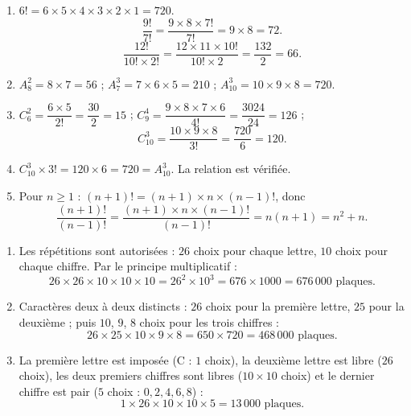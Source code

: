\documentclass[11pt]{article}
\begin{document}
\begin{corrige}
\begin{enumerate}
\item $6! = 6 \times 5 \times 4 \times 3 \times 2 \times 1 = 720$.
\[ \frac{9!}{7!} = \frac{9 \times 8 \times 7!}{7!} = 9 \times 8 = 72. \]
\[ \frac{12!}{10! \times 2!} = \frac{12 \times 11 \times 10!}{10! \times 2} = \frac{132}{2} = 66. \]
\item $A_8^2 = 8 \times 7 = 56$ ; \quad $A_7^3 = 7 \times 6 \times 5 = 210$ ; \quad $A_{10}^3 = 10 \times 9 \times 8 = 720$.
\item $C_6^2 = \dfrac{6 \times 5}{2!} = \dfrac{30}{2} = 15$ ; \quad $C_9^4 = \dfrac{9 \times 8 \times 7 \times 6}{4!} = \dfrac{3024}{24} = 126$ ;
\[ C_{10}^3 = \frac{10 \times 9 \times 8}{3!} = \frac{720}{6} = 120. \]
\item $C_{10}^3 \times 3! = 120 \times 6 = 720 = A_{10}^3$. La relation est vérifiée.
\item Pour $n \ge 1$ : $(n+1)! = (n+1) \times n \times (n-1)!$, donc
\[ \frac{(n+1)!}{(n-1)!} = \frac{(n+1) \times n \times (n-1)!}{(n-1)!} = n(n+1) = n^2 + n. \]
\end{enumerate}
\end{corrige}

\begin{corrige}
\begin{enumerate}
\item Les répétitions sont autorisées : $26$ choix pour chaque lettre, $10$ choix pour chaque chiffre. Par le principe multiplicatif :
\[ 26 \times 26 \times 10 \times 10 \times 10 = 26^2 \times 10^3 = 676 \times 1000 = 676\,000 \text{ plaques}. \]
\item Caractères deux à deux distincts : $26$ choix pour la première lettre, $25$ pour la deuxième ; puis $10$, $9$, $8$ choix pour les trois chiffres :
\[ 26 \times 25 \times 10 \times 9 \times 8 = 650 \times 720 = 468\,000 \text{ plaques}. \]
\item La première lettre est imposée (C : $1$ choix), la deuxième lettre est libre ($26$ choix), les deux premiers chiffres sont libres ($10 \times 10$ choix) et le dernier chiffre est pair ($5$ choix : $0, 2, 4, 6, 8$) :
\[ 1 \times 26 \times 10 \times 10 \times 5 = 13\,000 \text{ plaques}. \]
\end{enumerate}
\end{corrige}
\end{document}
